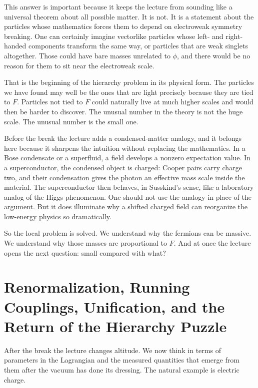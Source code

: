 This answer is important because it keeps the lecture from sounding like a universal theorem about all possible matter. It is not. It is a statement about the particles whose mathematics forces them to depend on electroweak symmetry breaking. One can certainly imagine vectorlike particles whose left- and right-handed components transform the same way, or particles that are weak singlets altogether. Those could have bare masses unrelated to \(\phi\), and there would be no reason for them to sit near the electroweak scale.

That is the beginning of the hierarchy problem in its physical form. The particles we have found may well be the ones that are light precisely because they are tied to \(F\). Particles not tied to \(F\) could naturally live at much higher scales and would then be harder to discover. The unusual number in the theory is not the huge scale. The unusual number is the small one.

Before the break the lecture adds a condensed-matter analogy, and it belongs here because it sharpens the intuition without replacing the mathematics. In a Bose condensate or a superfluid, a field develops a nonzero expectation value. In a superconductor, the condensed object is charged: Cooper pairs carry charge two, and their condensation gives the photon an effective mass scale inside the material. The superconductor then behaves, in Susskind's sense, like a laboratory analog of the Higgs phenomenon. One should not use the analogy in place of the argument. But it does illuminate why a shifted charged field can reorganize the low-energy physics so dramatically.

So the local problem is solved. We understand why the fermions can be massive. We understand why those masses are proportional to \(F\). And at once the lecture opens the next question: small compared with what?

\section{Renormalization, Running Couplings, Unification, and the Return of the Hierarchy Puzzle}

After the break the lecture changes altitude. We now think in terms of parameters in the Lagrangian and the measured quantities that emerge from them after the vacuum has done its dressing. The natural example is electric charge.


